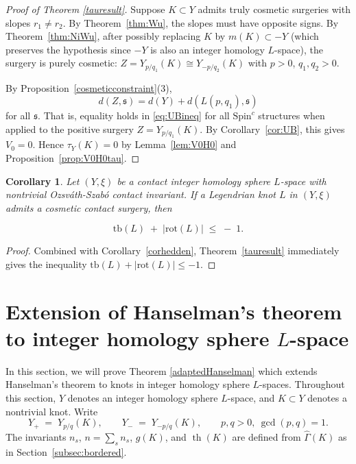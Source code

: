\documentclass[12pt]{amsart}
\newtheorem{corollary}[theorem]{Corollary}
\theoremstyle{definition}
\theoremstyle{definition}
\newcommand{\Spin}{\text{Spin}}
\newcommand{\rot}{\text{rot}}
\newcommand{\tb}{\text{tb}}
\newcommand{\Gh}{\widehat{\Gamma}}
\DeclareMathOperator{\Th}{th}
\newcommand{\din}{d}
\begin{document}
\begin{proof}[Proof of Theorem \ref{tauresult}] Suppose $K \subset Y$ admits truly cosmetic surgeries with slopes $r_1 \neq r_2$.
By Theorem~\ref{thm:Wu}, the slopes must have opposite signs.
By Theorem~\ref{thm:NiWu}, after possibly replacing $K$ by $m(K) \subset -Y$
(which preserves the hypothesis since $-Y$ is also an integer homology $L$-space),
the surgery is purely cosmetic:
$Z = Y_{p/q_1}(K) \cong Y_{-p/q_2}(K)$ with $p > 0$, $q_1, q_2 > 0$.

By Proposition~\ref{cosmeticconstraint}(3),
\begin{equation}\label{eq:dinZeq}
\din(Z,\mathfrak{s}) = \din(Y) + \din(L(p,q_1),\mathfrak{s})
\end{equation}
for all $\mathfrak{s}$.  That is, equality holds in \eqref{eq:UBineq} for all
$\Spin^c$ structures when applied to the positive surgery $Z = Y_{p/q_1}(K)$.
By Corollary~\ref{cor:UB}, this gives $V_0 = 0$. Hence $\tau_Y(K)= 0$ by Lemma~\ref{lem:V0H0} and Proposition~\ref{prop:V0H0tau}. 

\end{proof}

\begin{corollary}\label{taucosmeticcontraint}
Let $(Y,\xi)$ be a contact  integer homology sphere $L$-space with nontrivial Ozsv\'{a}th-Szab\'{o} contact invariant. If a Legendrian knot  $L$ in $(Y,\xi)$ admits a cosmetic contact surgery, then

\[
\tb(L)\;+\;\bigl|\rot(L)\bigr|
\;\le\;
-\;1.
\] 
\end{corollary}
\begin{proof}
Combined with Corollary~\ref{corhedden}, Theorem~\ref{tauresult}
immediately gives the inequality $\tb(L) + |\rot(L)| \leq -1$.
\end{proof}

\section{Extension of Hanselman's theorem to integer homology sphere $L$-space }\label{sec:Hanselman-extension}

In this section, we will prove Theorem \ref{adaptedHanselman} which extends Hanselman's \cite{Han} theorem to knots in integer homology sphere $L$-spaces. Throughout this section, $Y$ denotes an integer homology sphere $L$-space, and $K \subset Y$ denotes a nontrivial knot. Write
\[
Y_+ \;=\; Y_{p/q}(K), \qquad Y_- \;=\; Y_{-p/q}(K), \qquad p, q > 0,\ \gcd(p,q) = 1.
\]
The invariants $n_s$, $n = \sum_s n_s$, $g(K)$, and $\Th(K)$ are defined from $\Gh(K)$ as in Section~\ref{subsec:bordered}. 
\end{document}
